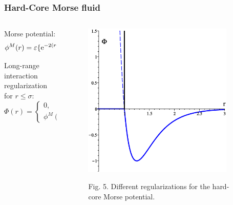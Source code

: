 \documentclass[8pt]{beamer}
\begin{document}
	\begin{frame}
		\frametitle{Hard-Core Morse fluid}
		
		\begin{columns}
			\begin{column}{0.5\textwidth}
				Morse potential:
				\begin{equation*}
					\phi^M(r) = \varepsilon \{{\rm e}^{-2(r-R_0)/\alpha}-2{\rm e}^{-(r-R_0)/\alpha}\}.
				\end{equation*}
				
				Long-range interaction regularization for $r \leq \sigma$:
				\begin{equation*}
					\Phi(r) = \left\{
					\begin{array}{ll}
						0, & r \leq \sigma 
						\\
						\phi^M(r), & r > \sigma.
					\end{array}
					\right.
				\end{equation*}
								
			\end{column}
			
			\begin{column}{0.5\textwidth}
				\begin{figure}[htbp]
					\includegraphics[width=0.9\textwidth,angle=0]{hcmorse} \\
					\parbox{0.8\textwidth}{\caption*{Fig. 5. Different regularizations for the hard-core Morse potential.
					}}
				\end{figure}
				
			\end{column}
		\end{columns}
		
	\end{frame}
	
\end{document}
